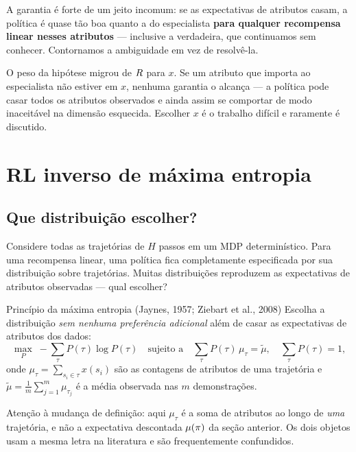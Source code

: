 \documentclass[11pt]{article}
\newcommand{\traj}{\tau}
\newcommand{\feat}{x}
\newcommand{\mufeat}{\mu}
\begin{document}
\begin{ideiabox}
  A garantia é forte de um jeito incomum: se as expectativas de atributos casam, a
  política é quase tão boa quanto a do especialista \textbf{para qualquer recompensa
  linear nesses atributos} --- inclusive a verdadeira, que continuamos sem conhecer.
  Contornamos a ambiguidade em vez de resolvê-la.
\end{ideiabox}

\begin{alertabox}
  O peso da hipótese migrou de $R$ para $\feat$. Se um atributo que importa ao
  especialista não estiver em $\feat$, nenhuma garantia o alcança --- a política pode
  casar todos os atributos observados e ainda assim se comportar de modo inaceitável na
  dimensão esquecida. Escolher $\feat$ é o trabalho difícil e raramente é discutido.
\end{alertabox}

\section{RL inverso de máxima entropia}

\subsection{Que distribuição escolher?}

Considere todas as trajetórias de $H$ passos em um MDP determinístico. Para uma recompensa
linear, uma política fica completamente especificada por sua distribuição sobre
trajetórias. Muitas distribuições reproduzem as expectativas de atributos observadas ---
qual escolher?

\begin{defbox}{Princípio da máxima entropia (Jaynes, 1957; Ziebart et al., 2008)}
  Escolha a distribuição \emph{sem nenhuma preferência adicional} além de casar as
  expectativas de atributos dos dados:
  \[
    \max_{P}\; -\sum_{\traj} P(\traj)\log P(\traj)
    \quad\text{sujeito a}\quad
    \sum_{\traj} P(\traj)\,\mufeat_{\traj} = \tilde\mufeat,
    \quad \sum_{\traj} P(\traj) = 1,
  \]
  onde $\mufeat_{\traj} = \sum_{s_i\in\traj}\feat(s_i)$ são as contagens de atributos de
  uma trajetória e $\tilde\mufeat = \frac{1}{m}\sum_{j=1}^{m}\mufeat_{\traj_j}$ é a média
  observada nas $m$ demonstrações.
\end{defbox}

\begin{alertabox}
  Atenção à mudança de definição: aqui $\mufeat_{\traj}$ é a soma de atributos ao longo de
  \emph{uma} trajetória, e não a expectativa descontada $\mufeat(\pol)$ da seção anterior.
  Os dois objetos usam a mesma letra na literatura e são frequentemente confundidos.
\end{alertabox}
\end{document}
